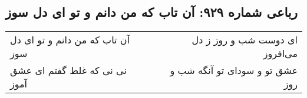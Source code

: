\begin{center}
\section*{رباعی شماره ۹۲۹: آن تاب که من دانم و تو ای دل سوز}
\label{sec:0929}
\begin{longtable}{l p{0.5cm} r}
آن تاب که من دانم و تو ای دل سوز
&&
ای دوست شب و روز ز دل می‌افروز
\\
نی نی که غلط گفتم ای عشق آموز
&&
عشق تو و سودای تو آنگه شب و روز
\\
\end{longtable}
\end{center}
